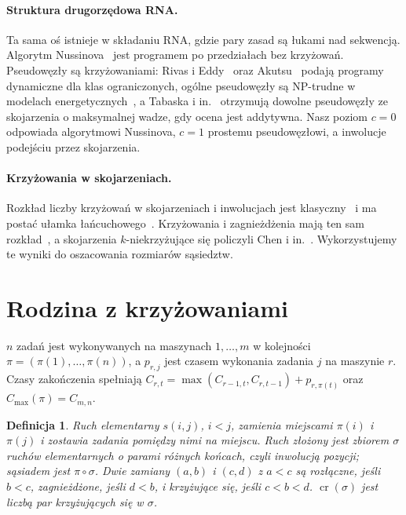 \documentclass[10pt,twocolumn]{article}
\newtheorem{definition}{Definicja}
\newcommand{\ncr}{\operatorname{cr}}
\begin{document}
\paragraph{Struktura drugorzędowa RNA.} Ta sama oś istnieje w składaniu
RNA, gdzie pary zasad są łukami nad sekwencją. Algorytm
Nussinova~\cite{nussinov1978} jest programem po przedziałach bez
krzyżowań. Pseudowęzły są krzyżowaniami: Rivas i Eddy~\cite{rivas1999}
oraz Akutsu~\cite{akutsu2000} podają programy dynamiczne dla klas
ograniczonych, ogólne pseudowęzły są NP-trudne w modelach
energetycznych~\cite{lyngso2000}, a Tabaska i in.~\cite{tabaska1998}
otrzymują dowolne pseudowęzły ze skojarzenia o maksymalnej wadze, gdy
ocena jest addytywna. Nasz poziom $c=0$ odpowiada algorytmowi Nussinova,
$c=1$ prostemu pseudowęzłowi, a inwolucje podejściu przez skojarzenia.

\paragraph{Krzyżowania w skojarzeniach.} Rozkład liczby krzyżowań
w skojarzeniach i inwolucjach jest klasyczny~\cite{touchard1952,riordan1975}
i ma postać ułamka łańcuchowego~\cite{flajolet1980}. Krzyżowania
i zagnieżdżenia mają ten sam rozkład~\cite{kasraoui2006}, a skojarzenia
$k$-niekrzyżujące się policzyli Chen i in.~\cite{chen2007}. Wykorzystujemy
te wyniki do oszacowania rozmiarów sąsiedztw.

\section{Rodzina z krzyżowaniami}\label{sec:family}

$n$ zadań jest wykonywanych na maszynach $1,\dots,m$ w kolejności
$\pi=(\pi(1),\dots,\pi(n))$, a $p_{r,j}$ jest czasem wykonania zadania
$j$ na maszynie $r$. Czasy zakończenia spełniają
$C_{r,t}=\max(C_{r-1,t},C_{r,t-1})+p_{r,\pi(t)}$ oraz
$C_{\max}(\pi)=C_{m,n}$.

\begin{definition}
\emph{Ruch elementarny} $s(i,j)$, $i<j$, zamienia miejscami $\pi(i)$
i $\pi(j)$ i zostawia zadania pomiędzy nimi na miejscu. \emph{Ruch
złożony} jest zbiorem $\sigma$ ruchów elementarnych o parami różnych
końcach, czyli inwolucją pozycji; sąsiadem jest $\pi\circ\sigma$. Dwie
zamiany $(a,b)$ i $(c,d)$ z $a<c$ są \emph{rozłączne}, jeśli $b<c$,
\emph{zagnieżdżone}, jeśli $d<b$, i \emph{krzyżujące się}, jeśli $c<b<d$.
$\ncr(\sigma)$ jest liczbą par krzyżujących się w $\sigma$.
\end{definition}
\end{document}
